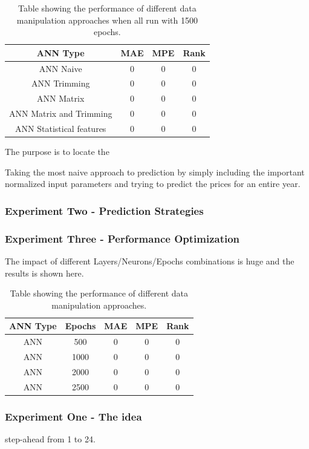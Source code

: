 \begin{table}[H]
\centering  %
\begin{tabular}{c c c c} %
ANN Type & MAE & MPE & Rank \\ [0.5ex] %
\hline                  %
ANN Naive & 0 & 0 & 0 \\ %
ANN Trimming & 0 & 0 & 0 \\
ANN Matrix  & 0 & 0 & 0\\
ANN Matrix and Trimming  & 0 & 0 & 0 \\ 
ANN Statistical features  & 0 & 0 & 0\\ [1ex] %
\hline %
\end{tabular}
\caption{Table showing the performance of different data manipulation approaches when all run with 1500 epochs.} %
\label{table:dataManipulationApproaches} %
\end{table}

The purpose is to locate the 


Taking the most naive approach to prediction by simply including the important normalized input parameters and trying to predict the prices for an entire year. 

\subsubsection{Experiment Two - Prediction Strategies}


\subsubsection{Experiment Three - Performance Optimization}
The impact of different Layers/Neurons/Epochs combinations is huge and the results is shown here.

\begin{table}[H]
\centering  %
\begin{tabular}{c c c c c} %
ANN Type & Epochs & MAE & MPE & Rank \\ [0.5ex] %
\hline                  %
ANN & 500 & 0 & 0 & 0 \\ %
ANN & 1000 & 0 & 0 & 0 \\
ANN & 2000 & 0 & 0 & 0 \\
ANN & 2500 & 0 & 0 & 0 \\ [1ex] %
\hline %
\end{tabular}
\caption{Table showing the performance of different data manipulation approaches.} %
\label{table:performanceOpti} %
\end{table} 

\subsubsection{Experiment One - The idea}
step-ahead from 1 to 24.

